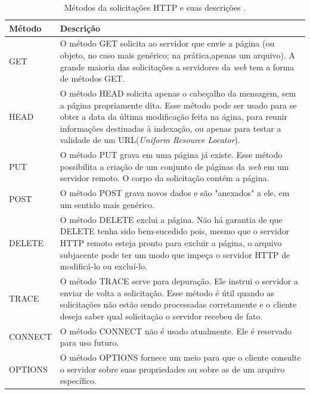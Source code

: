 \begin{table}[!ht]
\centering
\begin{tabular}{|l|l|}
\hline
{\color[HTML]{000000} \textbf{Método}} & {\color[HTML]{000000} \textbf{Descrição}} 
\\ \hline
GET                                    & \multicolumn{1}{p{13.50cm}|}{O método GET solicita ao servidor que envie a página (ou objeto, no caso mais genérico; na prática,apenas um arquivo). A grande maioria das solicitações a servidores da \textit{web} tem a forma de métodos GET.} 
\\ \hline
HEAD                                   & \multicolumn{1}{p{13.50cm}|}{O método HEAD solicita apenas o cabeçalho da mensagem, sem a página propriamente dita. Esse método pode ser usado para se obter a data da última modificação feita na ágina, para reunir informações destinadas à indexação, ou apenas para testar a validade de um URL(\textit{Uniform Resource Locator}).}
\\ \hline
PUT                                    & \multicolumn{1}{p{13.50cm}|}{O método PUT grava em uma página já existe. Esse método possibilita a criação de um conjunto de páginas da \textit{web} em um servidor remoto. O corpo da solicitação contém a página. } 
\\ \hline
POST                                   & \multicolumn{1}{p{13.50cm}|}{O método POST grava novos dados e são "anexados" a ele, em um sentido mais genérico.} 
\\ \hline
DELETE                                 & \multicolumn{1}{p{13.50cm}|}{O método DELETE exclui a página. Não há garantia de que DELETE tenha sido bem-sucedido pois, mesmo que o servidor HTTP remoto esteja pronto para excluir a página, o arquivo subjacente pode ter um modo que impeça o servidor HTTP de modificá-lo ou excluí-lo. }
\\ \hline
TRACE                                  & \multicolumn{1}{p{13.50cm}|}{O método TRACE serve para depuração. Ele instrui o servidor a enviar de volta a solicitação. Esse método é útil quando as solicitações não estão sendo processadas corretamente e o cliente deseja saber qual solicitação o servidor recebeu de fato.}   
\\ \hline
CONNECT                                & \multicolumn{1}{p{13.50cm}|}{O método CONNECT não é usado atualmente. Ele é reservado para uso futuro.} \\ \hline
OPTIONS                                & \multicolumn{1}{p{13.50cm}|}{O método OPTIONS fornece um meio para que o cliente consulte o servidor sobre suas propriedades ou sobre as de um arquivo específico.}
\\ \hline
\end{tabular}
\caption[Métodos da solicitações HTTP.]{Métodos da solicitações HTTP e suas descrições \cite{Tanenbaum:2003}.}
\label{Tab:MetodosHTTP}
\end{table}





